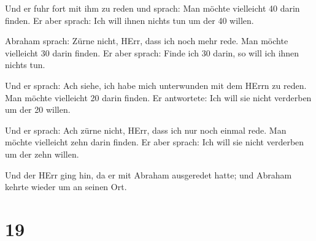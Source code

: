  Und er fuhr fort mit ihm zu reden und sprach: Man möchte
vielleicht 40 darin finden. Er aber sprach: Ich will ihnen nichts tun um
der 40 willen.

 Abraham sprach: Zürne nicht, HErr, dass ich noch mehr
rede. Man möchte vielleicht 30 darin finden. Er aber sprach: Finde ich
30 darin, so will ich ihnen nichts tun.

 Und er sprach: Ach siehe, ich habe mich unterwunden mit
dem HErrn zu reden. Man möchte vielleicht 20 darin finden. Er
antwortete: Ich will sie nicht verderben um der 20 willen.

 Und er sprach: Ach zürne nicht, HErr, dass ich nur noch
einmal rede. Man möchte vielleicht zehn darin finden. Er aber sprach:
Ich will sie nicht verderben um der zehn willen.

 Und der HErr ging hin, da er mit Abraham ausgeredet hatte;
und Abraham kehrte wieder um an seinen Ort.

\hypertarget{section-1}{%
\section{19}\label{section-1}}

